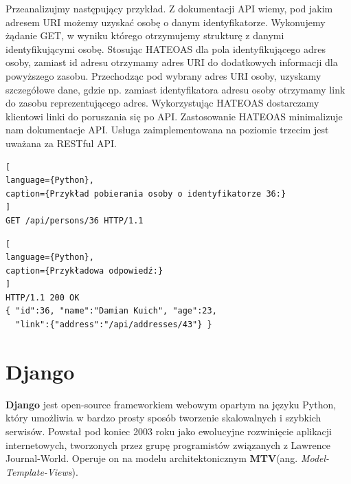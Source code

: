 \documentclass[oneside,polski,logo,indent]{amuthesis}
\begin{document}
\begin{enumerate}
\begin{enumerate}
\begin{enumerate}
Przeanalizujmy następujący przykład. Z dokumentacji API wiemy, pod jakim adresem URI możemy uzyskać osobę o danym identyfikatorze. Wykonujemy żądanie GET, w wyniku którego otrzymujemy strukturę z danymi identyfikującymi osobę. Stosując HATEOAS dla pola identyfikującego adres osoby, zamiast id adresu otrzymamy adres URI do dodatkowych informacji dla powyższego zasobu. Przechodząc pod wybrany adres URI osoby, uzyskamy szczegółowe dane, gdzie np. zamiast identyfikatora adresu osoby otrzymamy link do zasobu reprezentującego adres. Wykorzystując HATEOAS dostarczamy klientowi linki do poruszania się po API. Zastosowanie HATEOAS minimalizuje nam dokumentacje API. Usługa zaimplementowana na poziomie trzecim jest uważana za RESTful API.

\begin{lstlisting}[
language={Python},
caption={Przykład pobierania osoby o identyfikatorze 36:}
]
GET /api/persons/36 HTTP/1.1
\end{lstlisting}

\begin{lstlisting}[
language={Python},
caption={Przykładowa odpowiedź:}
]
HTTP/1.1 200 OK
{ "id":36, "name":"Damian Kuich", "age":23,
  "link":{"address":"/api/addresses/43"} }
\end{lstlisting} 

\end{enumerate}

\section{Django}
\textbf{Django} jest open-source frameworkiem webowym opartym na języku Python, który umożliwia w bardzo prosty sposób tworzenie skalowalnych i szybkich serwisów. Powstał pod koniec 2003 roku jako ewolucyjne rozwinięcie aplikacji internetowych, tworzonych przez grupę programistów związanych z Lawrence Journal-World. Operuje on na modelu architektonicznym \textbf{MTV}(ang. \emph{Model-Template-Views}). 


\end{enumerate}
\end{enumerate}
\end{document}
